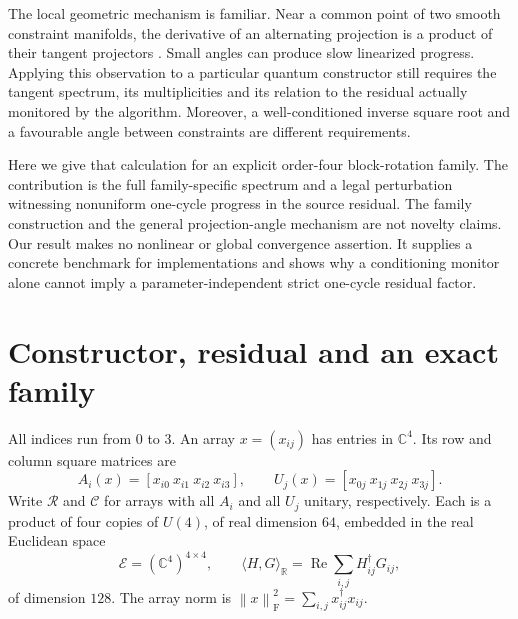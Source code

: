 \documentclass[11pt,a4paper]{article}
\newcommand{\C}{\mathbb C}
\newcommand{\R}{\mathbb R}
\newcommand{\adj}{^{\dagger}}
\newcommand{\fro}[1]{\left\|#1\right\|_{\mathrm F}}
\begin{document}
The local geometric mechanism is familiar. Near a common point of two smooth constraint manifolds, the derivative of an alternating projection is a product of their tangent projectors \cite{LewisMalick2008}. Small angles can produce slow linearized progress. Applying this observation to a particular quantum constructor still requires the tangent spectrum, its multiplicities and its relation to the residual actually monitored by the algorithm. Moreover, a well-conditioned inverse square root and a favourable angle between constraints are different requirements.

Here we give that calculation for an explicit order-four block-rotation family. The contribution is the full family-specific spectrum and a legal perturbation witnessing nonuniform one-cycle progress in the source residual. The family construction and the general projection-angle mechanism are not novelty claims. Our result makes no nonlinear or global convergence assertion. It supplies a concrete benchmark for implementations and shows why a conditioning monitor alone cannot imply a parameter-independent strict one-cycle residual factor.

\section{Constructor, residual and an exact family}
\label{sec:model}

All indices run from $0$ to $3$. An array $x=(x_{ij})$ has entries in $\C^4$. Its row and column square matrices are
\begin{equation}
 A_i(x)=[x_{i0}\ x_{i1}\ x_{i2}\ x_{i3}],\qquad
 U_j(x)=[x_{0j}\ x_{1j}\ x_{2j}\ x_{3j}].
 \label{eq:squares}
\end{equation}
Write $\mathcal R$ and $\mathcal C$ for arrays with all $A_i$ and all $U_j$ unitary, respectively. Each is a product of four copies of $U(4)$, of real dimension $64$, embedded in the real Euclidean space
\begin{equation}
 \mathcal E=(\C^4)^{4\times4},\qquad
 \langle H,G\rangle_{\R}=\operatorname{Re}\sum_{i,j}H_{ij}\adj G_{ij},
 \label{eq:metric}
\end{equation}
of dimension $128$. The array norm is $\fro{x}^2=\sum_{i,j}x_{ij}\adj x_{ij}$.
\end{document}
